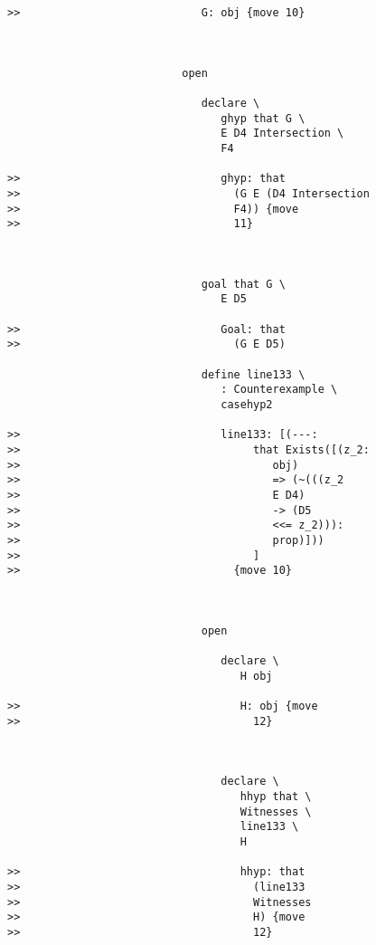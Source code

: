 \documentclass[12pt]{article}
\begin{document}
\begin{verbatim}
>>                            G: obj {move 10}



                           open

                              declare \
                                 ghyp that G \
                                 E D4 Intersection \
                                 F4

>>                               ghyp: that
>>                                 (G E (D4 Intersection
>>                                 F4)) {move
>>                                 11}



                              goal that G \
                                 E D5

>>                               Goal: that
>>                                 (G E D5)

                              define line133 \
                                 : Counterexample \
                                 casehyp2

>>                               line133: [(---:
>>                                    that Exists([(z_2:
>>                                       obj)
>>                                       => (~(((z_2
>>                                       E D4)
>>                                       -> (D5
>>                                       <<= z_2))):
>>                                       prop)]))
>>                                    ]
>>                                 {move 10}



                              open

                                 declare \
                                    H obj

>>                                  H: obj {move
>>                                    12}



                                 declare \
                                    hhyp that \
                                    Witnesses \
                                    line133 \
                                    H

>>                                  hhyp: that
>>                                    (line133
>>                                    Witnesses
>>                                    H) {move
>>                                    12}




\end{verbatim}
\end{document}
